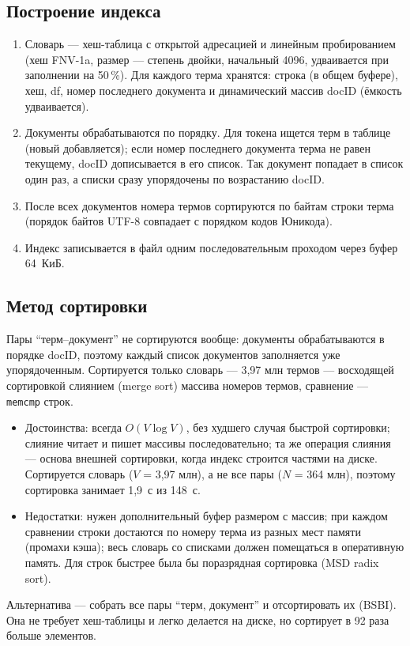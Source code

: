 \subsection{Построение индекса}
\begin{enumerate}
    \item Словарь --- хеш-таблица с открытой адресацией и линейным пробированием (хеш FNV-1a, размер --- степень двойки, начальный 4096, удваивается при заполнении на 50\,\%). Для каждого терма хранятся: строка (в общем буфере), хеш, df, номер последнего документа и динамический массив docID (ёмкость удваивается).
    \item Документы обрабатываются по порядку. Для токена ищется терм в таблице (новый добавляется); если номер последнего документа терма не равен текущему, docID дописывается в его список. Так документ попадает в список один раз, а списки сразу упорядочены по возрастанию docID.
    \item После всех документов номера термов сортируются по байтам строки терма (порядок байтов UTF-8 совпадает с порядком кодов Юникода).
    \item Индекс записывается в файл одним последовательным проходом через буфер 64~КиБ.
\end{enumerate}

\subsection{Метод сортировки}
Пары \enquote{терм--документ} не сортируются вообще: документы обрабатываются в порядке docID, поэтому каждый список документов заполняется уже упорядоченным. Сортируется только словарь --- 3,97 млн термов --- восходящей сортировкой слиянием (merge sort) массива номеров термов, сравнение --- \texttt{memcmp} строк.
\begin{itemize}
    \item Достоинства: всегда $O(V \log V)$, без худшего случая быстрой сортировки; слияние читает и пишет массивы последовательно; та же операция слияния --- основа внешней сортировки, когда индекс строится частями на диске. Сортируется словарь ($V$ = 3,97 млн), а не все пары ($N$ = 364 млн), поэтому сортировка занимает 1,9~с из 148~с.
    \item Недостатки: нужен дополнительный буфер размером с массив; при каждом сравнении строки достаются по номеру терма из разных мест памяти (промахи кэша); весь словарь со списками должен помещаться в оперативную память. Для строк быстрее была бы поразрядная сортировка (MSD radix sort).
\end{itemize}
Альтернатива --- собрать все пары \enquote{терм, документ} и отсортировать их (BSBI). Она не требует хеш-таблицы и легко делается на диске, но сортирует в 92 раза больше элементов.

